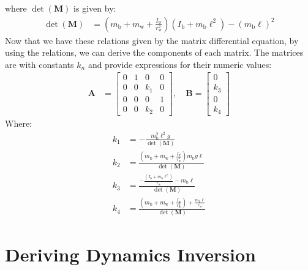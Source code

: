 \documentclass[journal]{IEEEtran}
\begin{document}
where $\det(\mathbf{M})$ is given by:
\begin{align}
    \det(\mathbf{M}) &= (m_{\mathrm{b}}+m_{\mathrm{w}}+\frac{I_{\mathrm{w}}}{r_{\mathrm{w}}^2})(I_{\mathrm{b}}+m_{\mathrm{b}}\ell^2) - (m_{\mathrm{b}}\ell)^2
\end{align}
Now that we have these relations given by the matrix differential equation, 
by using the relations, we can derive the components of each matrix. 
The matrices are with constants $k_{n}$ and provide expressions for their numeric values:
\begin{align}
\mathbf{A} &= \begin{bmatrix}
    0 & 1 & 0 & 0 \\
    0 & 0 & k_{1} & 0 \\
    0 & 0 & 0 & 1 \\
    0 & 0 & k_{2} & 0
\end{bmatrix}, \quad
\mathbf{B} = \begin{bmatrix}
    0 \\
    k_{3} \\
    0 \\
    k_{4}
\end{bmatrix}
\end{align}
Where:
\begin{align}
    k_{1} &= -\frac{m_{\mathrm{b}}^{2}\ell^{2}g}{\det(\mathbf{M})} \\
    k_{2} &= \frac{(m_{\mathrm{b}}+m_{\mathrm{w}}+\frac{I_{\mathrm{w}}}{r_{\mathrm{w}}^2})m_{\mathrm{b}}g\ell}{\det(\mathbf{M})} \\
    k_{3} &= \frac{-\frac{(I_{\mathrm{b}}+m_{\mathrm{b}}\ell^2)}{r_{\mathrm{w}}}-m_{\mathrm{b}}\ell}{\det(\mathbf{M})} \\
    k_{4} &= \frac{(m_{\mathrm{b}}+m_{\mathrm{w}}+\frac{I_{\mathrm{w}}}{r_{\mathrm{w}}^2})+\frac{m_{\mathrm{b}}\ell}{r_{\mathrm{w}}}}{\det(\mathbf{M})}
\end{align}

\section{Deriving Dynamics Inversion}
\end{document}

